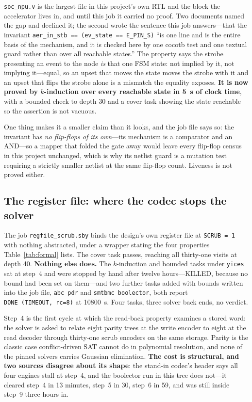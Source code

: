 \documentclass[11pt,a4paper]{article}
\newcommand{\file}[1]{\texttt{\small #1}}
\begin{document}
\file{soc\_npu.v} is the largest file in this project's own RTL and
the block the accelerator lives in, and until this job it carried no proof. Two
documents named the gap and declined it; the second wrote the sentence
this job answers---that the invariant
\texttt{aer\_in\_stb == (ev\_state == E\_PIN\_S)} ``is one line and is
the entire basis of the mechanism, and it is checked here by one cocotb
test and one textual guard rather than over all reachable states.'' The
property says the strobe presenting an event to the node \emph{is} that
one FSM state: not implied by it, not implying it---equal, so an upset
that moves the state moves the strobe with it and an upset that flips
the strobe alone is a mismatch the equality exposes. \textbf{It is now
proved by $k$-induction over every reachable state in \SI{5}{\second}
of clock time}, with a bounded check to depth \num{30} and a cover task
showing the state reachable so the assertion is not vacuous.

One thing makes it a smaller claim than it looks, and the job file says
so: the invariant has \emph{no flip-flops of its own}---its mechanism
is a comparator and an AND---so a mapper that folded the gate away
would leave every flip-flop census in this project unchanged, which is
why its netlist guard is a mutation test requiring a strictly smaller
netlist at the same flip-flop count. Liveness is not proved either.

\subsection{The register file: where the codec stops the solver}

The job \file{regfile\_scrub.sby} binds the design's own register file
at \texttt{SCRUB = 1} with nothing abstracted, under a wrapper stating
the four properties Table~\ref{tab:formal} lists. The cover task
passes, reaching all thirty-one visits at depth \num{40}.
\textbf{Nothing else does.} The $k$-induction and bounded tasks under
\texttt{yices} sat at step~4 and were stopped by hand after twelve
hours---KILLED, because no bound had been set on them---and two further
tasks added with bounds written into the job file, \texttt{abc pdr} and
\texttt{smtbmc boolector}, both report
\texttt{DONE}\allowbreak\ \texttt{(TIMEOUT,}\allowbreak\
\texttt{rc=8)} at \SI{10800}{\second}. Four tasks, three solver back
ends, no verdict.

Step~4 is the first cycle at which the read-back property examines a
stored word: the solver is asked to relate eight parity trees at the
write encoder to eight at the read decoder through thirty-one scrub
encoders on the same storage. Parity is the classic case
conflict-driven SAT cannot do in polynomial resolution, and none of the
pinned solvers carries Gaussian elimination. \textbf{The cost is
structural, and two sources disagree about its shape}: the stand-in
codec's header says all four engines stall at step~4, and the boolector
run in this tree does not---it cleared step~4 in \num{13} minutes,
step~5 in \num{30}, step~6 in \num{59}, and was still inside step~9
three hours in.
\end{document}

